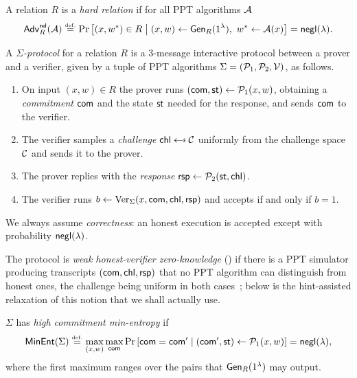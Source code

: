 \begin{definition}\label{def:hard-rel}
    A relation $R$ is a \emph{hard relation} if for all PPT algorithms $\mathcal{A}$
    \begin{equation}
        \mathsf{Adv}^{\mathsf{rel}}_{R}(\mathcal{A}) \overset{\scriptscriptstyle\mathrm{def.}}{=}
        \Pr\left[(x, w^*) \in R \;\middle|\;
            (x,w) \gets \operatorname{\mathsf{Gen}}_R(1^{\lambda}),\ w^* \gets \mathcal{A}(x)\right]
        = \mathsf{negl}(\lambda).
    \end{equation}
\end{definition}

\begin{definition}\label{def:sigma}
    A \emph{$\Sigma$-protocol} for a relation $R$ is a $3$-message interactive
    protocol between a prover and a verifier, given by a tuple of PPT algorithms
    $\Sigma = (\mathcal{P}_1, \mathcal{P}_2, \mathcal{V})$, as follows.
    \begin{enumerate}
        \item On input $(x,w) \in R$ the prover runs $(\mathsf{com}, \mathsf{st}) \gets
            \mathcal{P}_1(x,w)$, obtaining a \emph{commitment} $\mathsf{com}$ and the state
            $\mathsf{st}$ needed for the response, and sends $\mathsf{com}$ to the verifier.
        \item The verifier samples a \emph{challenge} $\chall \sample \cC$
            uniformly from the challenge space $\mathcal{C}$ and sends it to the prover.
        \item The prover replies with the \emph{response} $\mathsf{rsp} \gets
            \mathcal{P}_2(\mathsf{st}, \mathsf{chl})$.
        \item The verifier runs $b \gets \operatorname{Ver}_\Sigma(x, \mathsf{com}, \mathsf{chl}, \mathsf{rsp})$ and
            accepts if and only if $b = 1$.
    \end{enumerate}
    We always assume \emph{correctness}: an honest execution is accepted except
    with probability $\mathsf{negl}(\lambda)$.
\end{definition}

The protocol is \emph{weak honest-verifier zero-knowledge} (\wHVZK) if there is
a PPT simulator producing transcripts $(\mathsf{com}, \mathsf{chl}, \mathsf{rsp})$ that no PPT
algorithm can distinguish from honest ones, the challenge being uniform in both
cases~\cite[Definition~2.3]{C:ABDPW25};  below is the
hint-assisted relaxation of this notion that we shall actually use.

\begin{definition}\label{def:minent}
    $\Sigma$ has \emph{high commitment min-entropy} if
    \begin{equation}
        \mathsf{MinEnt}(\Sigma) \overset{\scriptscriptstyle\mathrm{def.}}{=} \max_{(x,w)} \max_{\mathsf{com}}
        \Pr\left[\mathsf{com} = \mathsf{com}' \;\middle|\; (\mathsf{com}', \mathsf{st}) \gets \mathcal{P}_1(x,w)\right]
        = \mathsf{negl}(\lambda),
    \end{equation}
    where the first maximum ranges over the pairs that $\operatorname{\mathsf{Gen}}_R(1^{\lambda})$ may
    output.
\end{definition}

